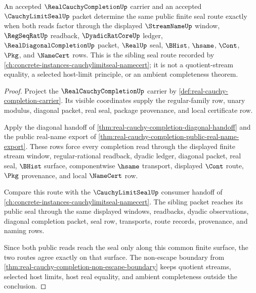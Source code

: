 \begin{theorem}
\label{thm:real-cauchy-completion-cauchy-limit-seal-route}
An accepted $\RealCauchyCompletionUp$ carrier and an accepted $\CauchyLimitSealUp$ packet determine the same public finite seal route exactly when both reads factor through the displayed $\StreamNameUp$ window, $\RegSeqRatUp$ readback, $\DyadicRatCoreUp$ ledger, $\RealDiagonalCompletionUp$ packet, $\RealUp$ seal, $\BHist$, $\hsame$, $\Cont$, $\Pkg$, and $\NameCert$ rows. This is the sibling seal route recorded by \autoref{ch:concrete-instances-cauchylimitseal-namecert}; it is not a quotient-stream equality, a selected host-limit principle, or an ambient completeness theorem.
\end{theorem}
\begin{proof}
Project the $\RealCauchyCompletionUp$ carrier by \autoref{def:real-cauchy-completion-carrier}. Its visible coordinates supply the regular-family row, unary modulus, diagonal packet, real seal, package provenance, and local certificate row.

Apply the diagonal handoff of \autoref{thm:real-cauchy-completion-diagonal-handoff} and the public real-name export of \autoref{thm:real-cauchy-completion-public-real-name-export}. These rows force every completion read through the displayed finite stream window, regular-rational readback, dyadic ledger, diagonal packet, real seal, $\BHist$ surface, componentwise $\hsame$ transport, displayed $\Cont$ route, $\Pkg$ provenance, and local $\NameCert$ row.

Compare this route with the $\CauchyLimitSealUp$ consumer handoff of \autoref{ch:concrete-instances-cauchylimitseal-namecert}. The sibling packet reaches its public seal through the same displayed windows, readbacks, dyadic observations, diagonal completion packet, seal row, transports, route records, provenance, and naming rows.

Since both public reads reach the seal only along this common finite surface, the two routes agree exactly on that surface. The non-escape boundary from \autoref{thm:real-cauchy-completion-non-escape-boundary} keeps quotient streams, selected host limits, host real equality, and ambient completeness outside the conclusion.
\end{proof}

